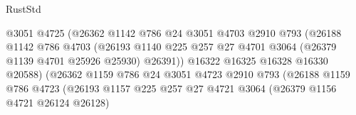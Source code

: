 \begin{lexlean}{RustStd}
\begin{coremodule}
                                            @3051
                                            @4725
                                            (@26362
                                              @1142
                                              @786
                                              @24
                                              @3051
                                              @4703
                                              @2910
                                              @793
                                              (@26188
                                                @1142
                                                @786
                                                @4703
                                                (@26193
                                                  @1140
                                                  @225
                                                  @257
                                                  @27
                                                  @4701
                                                  @3064
                                                  (@26379 @1139 @4701 @25926 @25930)
                                                  @26391))
                                              @16322
                                              @16325
                                              @16328
                                              @16330
                                              @20588)
                                            (@26362
                                              @1159
                                              @786
                                              @24
                                              @3051
                                              @4723
                                              @2910
                                              @793
                                              (@26188
                                                @1159
                                                @786
                                                @4723
                                                (@26193
                                                  @1157
                                                  @225
                                                  @257
                                                  @27
                                                  @4721
                                                  @3064
                                                  (@26379 @1156 @4721 @26124 @26128)

\end{coremodule}
\end{lexlean}

